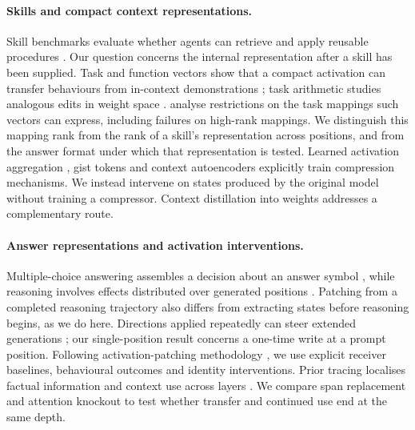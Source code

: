 \documentclass{article}
\begin{document}
\paragraph{Skills and compact context representations.}
Skill benchmarks evaluate whether agents can retrieve and apply reusable
procedures \citep{su2026srabench, skillsbench2026, sweskills2026}. Our question
concerns the internal representation after a skill has been supplied.
Task and function vectors show that a compact activation can transfer behaviours
from in-context demonstrations \citep{hendel2023taskvectors,
todd2024functionvectors}; task arithmetic studies analogous edits in weight
space \citep{ilharco2023taskarithmetic}.
\citet{dong2026taskvectorlimits} analyse restrictions on the task mappings such
vectors can express, including failures on high-rank mappings. We distinguish
this mapping rank from the rank of a skill's representation across positions,
and from the answer format under which that representation is tested.
Learned activation aggregation \citep{ardoin2026promptcompression}, gist tokens
\citep{mu2023gist} and context autoencoders \citep{ge2024icae} explicitly train
compression mechanisms. We instead intervene on states produced by the original
model without training a compressor. Context distillation into weights
\citep{doc2lora2026, deepcontextdistill2025} addresses a complementary route.

\paragraph{Answer representations and activation interventions.}
Multiple-choice answering assembles a decision about an answer symbol
\citep{wiegreffe2025mcq}, while reasoning involves effects distributed over
generated positions \citep{dura2026sequentialpatching}. Patching from a completed
reasoning trajectory \citep{mehrafarin2026cothidden} also differs from extracting
states before reasoning begins, as we do here. Directions applied repeatedly
can steer extended generations \citep{panickssery2024caa, liu2024icv,
stolfo2025instruction}; our single-position result concerns a one-time write
at a prompt position. Following activation-patching methodology
\citep{zhang2023bestpractices, heimersheim2024patching}, we use explicit receiver
baselines, behavioural outcomes and identity interventions. Prior tracing
localises factual information and context use across layers
\citep{meng2022rome, geva2023dissecting, sia2024incontexttranslation,
onset2025instruction}. We compare span replacement and attention knockout to
test whether transfer and continued use end at the same depth.
\end{document}

